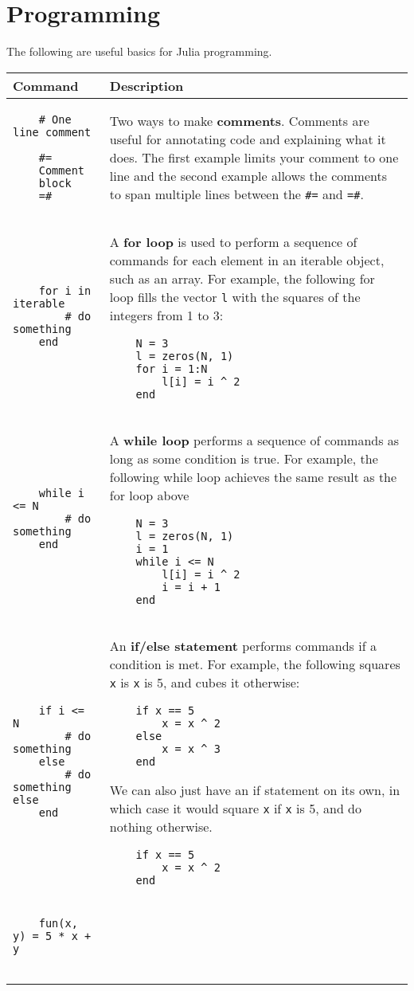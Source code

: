 \documentclass[]{article}
\begin{document}
\section{Programming}
The following are useful basics for Julia programming.
\begin{longtable}{ |m{6cm}  | m{11cm} |}
	\hline
	\textbf{Command} & \textbf{Description}
	\\\hline
	\begin{verbatim}
    # One line comment

    #=
    Comment 
    block
    =#
	\end{verbatim}
	& Two ways to make \textbf{comments}. Comments are useful for annotating
    code and explaining what it does. The first example limits your comment to
    one line and the second example allows the comments to span multiple lines
    between the \texttt{\#=} and \texttt{=\#}.
    \\\hline
\begin{verbatim}
    for i in iterable
        # do something
    end
	\end{verbatim}
	& A \textbf{for loop} is used to perform a sequence of commands for each
    element in an iterable object, such as an array. For example, the
    following for loop fills the vector \texttt{l} with the squares of the
    integers from 1 to 3:
    \begin{verbatim}
    N = 3
    l = zeros(N, 1)
    for i = 1:N
        l[i] = i ^ 2
    end
    \end{verbatim}
    \\\hline
\begin{verbatim}
    while i <= N
        # do something
    end
	\end{verbatim}
	& A \textbf{while loop} performs a sequence of commands as long as some
    condition is true. For example, the
    following while loop achieves the same result as the for loop above
    \begin{verbatim}
    N = 3
    l = zeros(N, 1)
    i = 1
    while i <= N
        l[i] = i ^ 2
        i = i + 1
    end
    \end{verbatim}
    \\\hline
\begin{verbatim}
    if i <= N
        # do something
    else
        # do something else
    end
	\end{verbatim}
	& An \textbf{if/else statement} performs commands if a condition is met. For example, the
    following squares \texttt{x} is \texttt{x} is 5, and cubes it otherwise:
    \begin{verbatim}
    if x == 5
        x = x ^ 2
    else
        x = x ^ 3
    end
    \end{verbatim}
    We can also just have an if statement on its own, in which case it would
    square \texttt{x} if \texttt{x} is 5, and do nothing otherwise.
    \begin{verbatim}
    if x == 5
        x = x ^ 2
    end
    \end{verbatim}
    \\\hline
\begin{verbatim}
    fun(x, y) = 5 * x + y


\end{verbatim}
\end{longtable}
\end{document}
